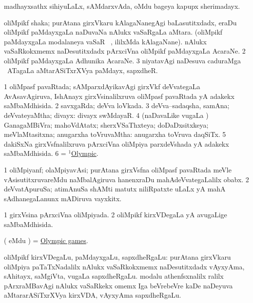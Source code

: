 \bentry
{}
\gl{\nA}
\bmng
madhayxsathx sihiyuLaLx, sAMdarxvAda, oMdu bageya kapupx sherimadayx. 
\emng
\eentry

\bentry
{}
\gl{\nA}
\bmng
\bnum
{} 
\banum
{} oliMpikf shaka; purAtana girxVkaru kAlagaNanegAgi baLasutitxdadx, eraDu oliMpikf paMdayxgaLa naDuvaNa nAlukx vaSaRgaLa aMtara. (oliMpikf paMdayxgaLa modalaneya vaSaR \kirxpU\ , ililxMda kAlagaNane). 
 nAlukx vaSaRkokxmemx naDesutitxdadx pArxciVna oliMpikf paMdayxgaLa AcaraNe. 
\eanum
\numie
\num{2} oliMpikf paMdayxgaLa Adhunika AcaraNe. 
\num{3} niyatavAgi naDesuva caduraMga \mo\ ATagaLa aMtarASiTxrXVya paMdayx, sapxdheR. 
\enum
\emng
\eentry

\bentry
{}
\gl{\gu}
\bmng
\bnum
\num{1} oliMpasf pavaRtada; sAMparxdAyikavAgi girxVkf deVvategaLa AvAsavAgiruva, IshAnayx girxVsinalilxruva oliMpasf pavaRtada yA adakekx saMbaMdhisida. 
\num{2} savxgaRda; deVva loVkada. 
\num{3} deVva--sadaqsha, samAna; deVvateyaMtha; divayx:  divayx swMdayaR. 
\num{4} (naDavaLike \mo vugaLa \vi) GanagaMBiVra; mahoVdAtatx; sherxVSaThxteya; doDaDxsitxkeya; meVlaMtasitxna; anugarxha toVruvaMtha:  anugarxha toVruva daqSiTx. 
\num{5} dakiSxNa girxVsfnalilxruva pArxciVna oliMpiya parxdeVshada yA adakekx saMbaMdhisida. 
\num{6} = \hyperlink{Olympic(1)}{$^1$Olympic}. 
\enum
\emng
\eentry

\bentry
{}
\gl{\nA}
\bmng
\bnum
\num{1} oliMpiyanf; olaMpiyavAsi; purAtana girxVsfna oliMpasf pavaRtada meVle vAsisutitxruvareMdu naMbalAgiruva hanenxraDu mahAdeVvategaLalilx obabx. 
\num{2} deVvatApuruSa; atimAnuSa shAMti matutx niliRpatxte uLaLx yA mahA sAdhanegaLanunx mADiruva vayxkitx. 
\enum
\emng
\eentry

\bentry
{}
\gl{\gu}
\bmng
\bnum
\num{1} girxVsina pArxciVna oliMpiyada. 
\num{2} oliMpikf kirxVDegaLa yA avugaLige saMbaMdhisida. 
\enum
\emng
\eentry

\bentry
{}
\gl{\nA}
\bmng
( eMdu \parx) = \hyperlink{Olympic games}{Olympic games}. 
\emng
\eentry

\bentry
{}
\gl{\nA}
\bmng
oliMpikf kirxVDegaLu, paMdayxgaLu, sapxdheRgaLu: 
\banum
{} purAtana girxVkaru oliMpiya paTaTxNadalilx nAlukx vaSaRkokxmemx naDesutitxdadx vAyxyAma, sAhitayx, saMgiVta, \mo vugaLa sapxdheRgaLu. 
 modalu athenfsxnalilx ralilx pArxraMBavAgi nAlukx vaSaRkekx omemx Iga beVrebeVre kaDe naDeyuva aMtararASiTxrXVya kirxVDA, vAyxyAma sapxdheRgaLu. 
\eanum
\emng
\eentry

